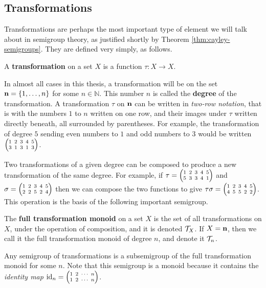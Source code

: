 \subsection{Transformations}
\label{sec:transformations}

Transformations are perhaps the most important type of element we will talk
about in semigroup theory, as justified shortly by Theorem
\ref{thm:cayley-semigroups}.  They are defined very simply, as follows.

\begin{definition}
  \label{def:transformation}
  A \textbf{transformation} on a set $X$ is a function $\tau: X \to X$.
\end{definition}

In almost all cases in this thesis, a transformation will be on the set
$\mathbf{n} = \{1, \ldots, n\}$ for some $n \in \mathbb{N}$.  This number $n$ is called
the \textbf{degree} of the transformation. A transformation
$\tau$ on $\mathbf{n}$ can be written in \textit{two-row notation},  that is with the numbers $1$ to $n$ written on one row, and their
images under $\tau$ written directly beneath, all surrounded by parentheses.
For example, the transformation of degree $5$ sending even numbers to $1$ and
odd numbers to $3$ would be written $\transV31313$.

Two transformations of a given degree can be composed to produce a new
transformation of the same degree.  For example, if $\tau = \transV53341$ and
$\sigma = \transV22524$ then we can compose the two functions to give
$\tau\sigma = \transV45522$.  This operation is the basis of the following
important semigroup.

\begin{definition}
  \label{def:tn}
  The \textbf{full transformation monoid} on a set $X$ is the
  set of all transformations on $X$, under the operation of composition, and it
  is denoted $\mathcal{T}_X$.  If $X = \mathbf{n}$, then we call it the full transformation
  monoid of degree $n$, and denote it $\mathcal{T}_n$.
\end{definition}

Any semigroup of transformations is a subsemigroup of the full transformation
monoid for some $n$.  Note that this semigroup is a monoid because it contains
the \textit{identity map} $\id_n = \transN{1}{2}{n}$.

